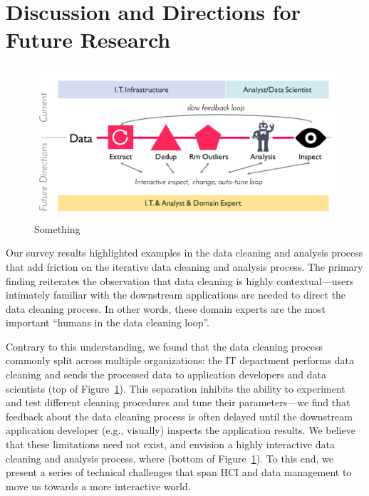 \section{Discussion and Directions for Future Research}\label{sec:future}


\begin{figure}
  \centering
  \includegraphics[width=.8\columnwidth]{datafigs/arch}
  \caption{Something}
  \label{f:arch}
\end{figure}

Our survey results highlighted examples in the data cleaning and analysis process that add friction on the iterative data cleaning and analysis process.  The primary finding reiterates the observation that data cleaning is highly contextual---users intimately familiar with the downstream applications are needed to direct the data cleaning process.  In other words, these domain experts are the most important ``humans in the data cleaning loop''.  

Contrary to this understanding, we found that the data cleaning process commonly split across multiple organizations: the IT department performs data cleaning and sends the processed data to application developers and data scientists (top of Figure~\ref{f:arch}).  This separation inhibits the ability to experiment and test different cleaning procedures and tune their parameters---we find that feedback about the data cleaning process is often delayed until the downstream application developer (e.g., visually) inspects the application results.  We believe that these limitations need not exist, and envision a highly interactive data cleaning and analysis process, where {\color{red}{something sexy}} (bottom of Figure~\ref{f:arch}). To this end, we present a series of technical challenges that span HCI and data management to move us towards a more interactive world.



